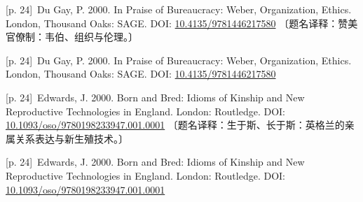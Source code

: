 \documentclass[10pt,a4paper]{article}
\begin{document}
\noindent\begin{minipage}{\textwidth}\begin{minipage}[t]{\dimexpr.5\textwidth-4mm\relax}\noindent\begin{minipage}[t]{\linewidth}{\scriptsize\color{gray} [p. 24]}\ Du Gay, P. 2000. In Praise of Bureaucracy: Weber, Organization, Ethics. London, Thousand Oaks: SAGE. DOI: \url{10.4135/9781446217580} 〔题名译释：赞美官僚制：韦伯、组织与伦理。〕\par\end{minipage}\par\end{minipage}\hfill\begin{minipage}[t]{\dimexpr.5\textwidth-4mm\relax}\noindent\begin{minipage}[t]{\linewidth}{\scriptsize\color{gray} [p. 24]}\ Du Gay, P. 2000. In Praise of Bureaucracy: Weber, Organization, Ethics. London, Thousand Oaks: SAGE. DOI: \url{10.4135/9781446217580}\par\end{minipage}\par\end{minipage}\end{minipage}\par
\noindent\begin{minipage}{\textwidth}\begin{minipage}[t]{\dimexpr.5\textwidth-4mm\relax}\noindent\begin{minipage}[t]{\linewidth}{\scriptsize\color{gray} [p. 24]}\ Edwards, J. 2000. Born and Bred: Idioms of Kinship and New Reproductive Technologies in England. London: Routledge. DOI: \url{10.1093/oso/9780198233947.001.0001} 〔题名译释：生于斯、长于斯：英格兰的亲属关系表达与新生殖技术。〕\par\end{minipage}\par\end{minipage}\hfill\begin{minipage}[t]{\dimexpr.5\textwidth-4mm\relax}\noindent\begin{minipage}[t]{\linewidth}{\scriptsize\color{gray} [p. 24]}\ Edwards, J. 2000. Born and Bred: Idioms of Kinship and New Reproductive Technologies in England. London: Routledge. DOI: \url{10.1093/oso/9780198233947.001.0001}\par\end{minipage}\par\end{minipage}\end{minipage}\par
\end{document}
